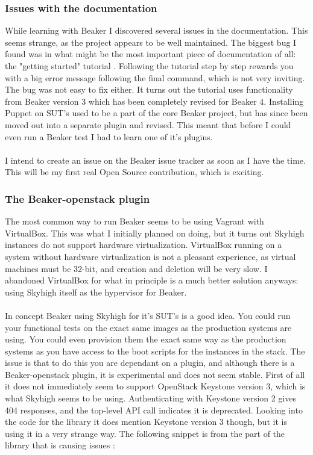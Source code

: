 \subsubsection{Issues with the documentation}

While learning with Beaker I discovered several issues in the documentation. This seems strange, as the project appears to be well maintained. The biggest bug I found was in what might be the most important piece of documentation of all: the "getting started" tutorial \cite{beakertutorialwithproblem}. Following the tutorial step by step rewards you with a big error message following the final command, which is not very inviting. The bug was not easy to fix either. It turns out the tutorial uses functionality from Beaker version 3 which has been completely revised for Beaker 4. Installing Puppet on SUT's used to be a part of the core Beaker project, but has since been moved out into a separate plugin and revised. This meant that before I could even run a Beaker test I had to learn one of it's plugins.
\\
\\
I intend to create an issue on the Beaker issue tracker \cite{beakerissuetracker} as soon as I have the time. This will be my first real Open Source contribution, which is exciting.

\subsubsection{The Beaker-openstack plugin}

The most common way to run Beaker seems to be using Vagrant with VirtualBox. This was what I initially planned on doing, but it turns out Skyhigh instances do not support hardware virtualization. VirtualBox running on a system without hardware virtualization is not a pleasant experience, as virtual machines must be 32-bit, and creation and deletion will be very slow. I abandoned VirtualBox for what in principle is a much better solution anyways: using Skyhigh itself as the hypervisor for Beaker.
\\
\\
In concept Beaker using Skyhigh for it's SUT's is a good idea. You could run your functional tests on the exact same images as the production systems are using. You could even provision them the exact same way as the production systems as you have access to the boot scripts for the instances in the stack. The issue is that to do this you are dependant on a plugin, and although there is a Beaker-openstack plugin, it is experimental and does not seem stable. First of all it does not immediately seem to support OpenStack Keystone version 3, which is what Skyhigh seems to be using. Authenticating with Keystone version 2 gives 404 responses, and the top-level API call indicates it is deprecated. Looking into the code for the library it does mention Keystone version 3 though, but it is using it in a very strange way. The following snippet is from the part of the library that is causing issues \cite{beakeropenstackproblematicpart}:


